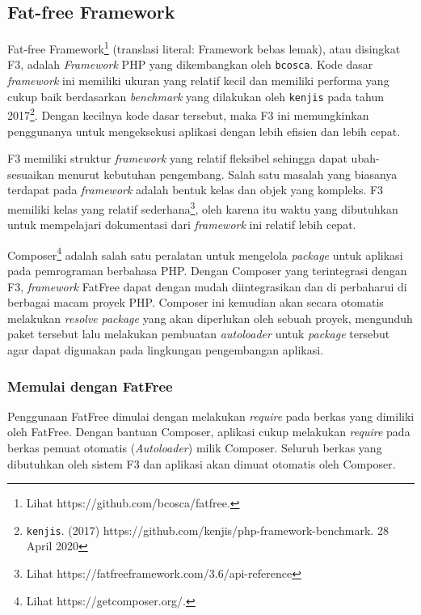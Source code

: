 \subsection{Fat-free Framework}
    Fat-free Framework\footnote{Lihat https://github.com/bcosca/fatfree.}
    (translasi literal: Framework bebas lemak), atau disingkat F3, adalah
    \textit{Framework} PHP yang dikembangkan oleh \texttt{bcosca}. Kode dasar
    \textit{framework} ini memiliki ukuran yang relatif kecil dan memiliki
    performa yang cukup baik berdasarkan \textit{benchmark} yang dilakukan oleh
    \texttt{kenjis} pada tahun 2017\footnote{\texttt{kenjis}. (2017)
    https://github.com/kenjis/php-framework-benchmark. 28 April 2020}. Dengan
    kecilnya kode dasar tersebut, maka F3 ini memungkinkan penggunanya untuk
    mengeksekusi aplikasi dengan lebih efisien dan lebih cepat.
    
    
    F3 memiliki struktur \textit{framework} yang relatif fleksibel sehingga
    dapat ubah-sesuaikan menurut kebutuhan pengembang. Salah satu masalah yang
    biasanya terdapat pada \textit{framework} adalah bentuk kelas dan objek yang
    kompleks. F3 memiliki kelas yang relatif sederhana\footnote{Lihat
    https://fatfreeframework.com/3.6/api-reference}, oleh karena itu waktu yang
    dibutuhkan untuk mempelajari dokumentasi dari \textit{framework} ini relatif
    lebih cepat.
    
    Composer\footnote{Lihat https://getcomposer.org/.} adalah salah satu
    peralatan untuk mengelola \textit{package} untuk aplikasi pada pemrograman
    berbahasa PHP. Dengan Composer yang terintegrasi dengan F3, \textit{framework}
    FatFree dapat dengan mudah diintegrasikan dan di perbaharui di berbagai macam
    proyek PHP. Composer ini kemudian akan secara otomatis melakukan \textit{resolve}
    \textit{package} yang akan diperlukan oleh sebuah proyek, mengunduh paket
    tersebut lalu melakukan pembuatan \textit{autoloader} untuk \textit{package}
    tersebut agar dapat digunakan pada lingkungan pengembangan aplikasi.

    \subsubsection{Memulai dengan FatFree}
    Penggunaan FatFree dimulai dengan melakukan \textit{require} pada berkas yang
    dimiliki oleh FatFree. Dengan bantuan Composer, aplikasi cukup melakukan
    \textit{require} pada berkas pemuat otomatis (\textit{Autoloader}) milik Composer.
    Seluruh berkas yang dibutuhkan oleh sistem F3 dan aplikasi akan dimuat otomatis
    oleh Composer.
    

